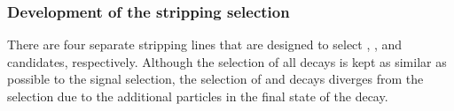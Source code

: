 \subsubsection{Development of the stripping selection}
\label{strippingold}





There are four separate stripping lines that are designed to select \bmumu, \bujpsik, \bsjpsiphi and \bhh candidates, respectively. Although the selection of all decays is kept as similar as possible to the signal selection, the selection of \bujpsik and \bsjpsiphi decays diverges from the \bmumu selection due to the additional particles in the final state of the decay. 


